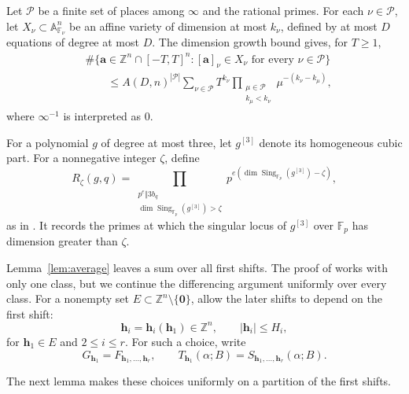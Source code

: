\documentclass[reqno,a4paper,11pt]{amsart}
\numberwithin{equation}{section}
\newcommand{\ZZ}{\mathbb Z}
\newcommand{\h}{\mathbf h}
\theoremstyle{plain}
\theoremstyle{definition}
\begin{document}
Let \(\mathcal P\) be a finite set of places among \(\infty\) and the rational primes.
For each \(\nu\in\mathcal P\), let \(X_\nu\subset\mathbb A_{\mathbb F_\nu}^n\) be an affine variety of dimension at most \(k_\nu\), defined by at most \(D\) equations of degree at most \(D\).
The dimension growth bound \cite[Lemma~2.5]{bp} gives, for \(T\geq1\),
\begin{equation}\label{eq:dimension-growth-bound}
 \begin{aligned}
 &\#\{\mathbf a\in\ZZ^n\cap[-T,T]^n:
 [\mathbf a]_\nu\in X_\nu\text{ for every }\nu\in\mathcal P\}\\
 &\qquad\leq A(D,n)^{|\mathcal P|}
 \sum_{\nu\in\mathcal P}T^{k_\nu}
 \prod_{\substack{\mu\in\mathcal P\\k_\mu<k_\nu}}
 \mu^{-(k_\nu-k_\mu)},
 \end{aligned}
\end{equation}
where \(\infty^{-1}\) is interpreted as \(0\).

For a polynomial \(g\) of degree at most three, let \(g^{[3]}\) denote its homogeneous cubic part.
For a nonnegative integer \(\zeta\), define
\[
 R_\zeta(g,q)
 =\prod_{\substack{p^e\Vert 3b_q\\
 \dim\operatorname{Sing}_{\mathbb F_p}(g^{[3]})>\zeta}}
 p^{e(\dim\operatorname{Sing}_{\mathbb F_p}(g^{[3]})-\zeta)},
\]
as in \cite[Eq.~(3.13)]{bp}.
It records the primes at which the singular locus of \(g^{[3]}\) over \(\mathbb F_p\) has dimension greater than \(\zeta\).

Lemma~\ref{lem:average} leaves a sum over all first shifts.
The proof of \cite[Lemma~3.5]{bp} works with only one class, but we continue the differencing argument uniformly over every class.
For a nonempty set \(E\subset\ZZ^n\setminus\{\boldsymbol 0\}\), allow the later shifts to depend on the first shift:
\[
 \h_i=\h_i(\h_1)\in\ZZ^n,
 \qquad |\h_i|\leq H_i,
\]
for \(\h_1\in E\) and \(2\leq i\leq r\).
For such a choice, write
\[
 G_{\h_1}=F_{\h_1,\ldots,\h_r},
 \qquad
 T_{\h_1}(\alpha;B)=S_{\h_1,\ldots,\h_r}(\alpha;B).
\]

The next lemma makes these choices uniformly on a partition of the first shifts.
\end{document}
